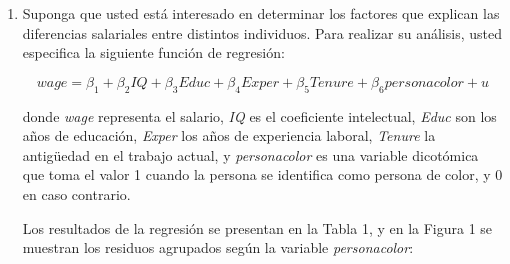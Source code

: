 \documentclass[10pt,a4paper]{article}
\begin{document}
\begin{enumerate}
\begin{enumerate}
{Despejando:

\[
\beta_1 = \frac{\operatorname{Cov}(y_i, z_i)}{\operatorname{Cov}(x_i, z_i)} \implies \beta_1 = \frac{-4,3215}{-2,94765} = 1,4661
\]

Como la distancia a la cancha reduce las horas de entrenamiento, y entrenar más aumenta el rendimiento, se espera que $\operatorname{Cov}(x_i, z_i) < 0$ y $\operatorname{Cov}(y_i, z_i) < 0$, por lo que $\beta_1 > 0$: entrenar más tiene un efecto positivo sobre los puntos anotados, particularmente, una hora más de entrenamiento a la semana genera que el promedio de puntos suba 1,47 puntos.\\
    }

    \item (5 puntos) ¿El coeficiente estimado mediante variable instrumental será mayor o menor que el estimado por MCO?\\
{\color{blue}
    \textbf{Respuesta:} Si la motivación no observada está positivamente correlacionada con las horas de entrenamiento, entonces el estimador MCO de $\beta_1$ estará sesgado hacia arriba: capta tanto el efecto del entrenamiento como el de la motivación. En cambio, la estimación por variable instrumental elimina este sesgo. Por tanto, el coeficiente estimado por IV será \textbf{menor} que el estimado por MCO.}

\end{enumerate}

\item Suponga que usted está interesado en determinar los factores que explican
las diferencias salariales entre distintos individuos. Para realizar
su análisis, usted especifica la siguiente función de regresión:

\begin{equation}
wage = \beta_{1} + \beta_{2}IQ + \beta_{3}Educ + \beta_{4}Exper + \beta_{5}Tenure + \beta_{6}personacolor + u \label{eq:original}
\end{equation}

donde \emph{wage} representa el salario, \emph{IQ} es el coeficiente intelectual,
\emph{Educ} son los años de educación, \emph{Exper} los años de experiencia laboral,
\emph{Tenure} la antigüedad en el trabajo actual, y \emph{personacolor} es una variable dicotómica
que toma el valor 1 cuando la persona se identifica como {persona de color}, y 0 en caso contrario.


Los resultados de la regresión se presentan en la Tabla 1, y en la Figura 1 se muestran los residuos
agrupados según la variable \emph{personacolor}:


\end{enumerate}
\end{document}
